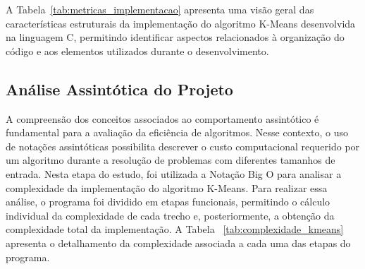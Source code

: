 \documentclass[10pt,a4paper,twocolumn]{article}
\begin{document}
A Tabela~\ref{tab:metricas_implementacao} apresenta uma visão geral das características estruturais da implementação do algoritmo K-Means desenvolvida na linguagem C, permitindo identificar aspectos relacionados à organização do código e aos elementos utilizados durante o desenvolvimento. 

\subsection{Análise Assintótica do Projeto}


A compreensão dos conceitos associados ao comportamento assintótico é fundamental para a avaliação da eficiência de algoritmos. Nesse contexto, o uso de notações assintóticas possibilita descrever o custo computacional requerido por um algoritmo durante a resolução de problemas com diferentes tamanhos de entrada.\cite{Serpa2021}
Nesta etapa do estudo, foi utilizada a Notação Big O para analisar a complexidade da implementação do algoritmo K-Means. Para realizar essa análise, o programa foi dividido em etapas funcionais, permitindo o cálculo individual da complexidade de cada trecho e, posteriormente, a obtenção da complexidade total da implementação. A Tabela ~\ref{tab:complexidade_kmeans} apresenta o detalhamento da complexidade associada a cada uma das etapas do programa. 
\end{document}
